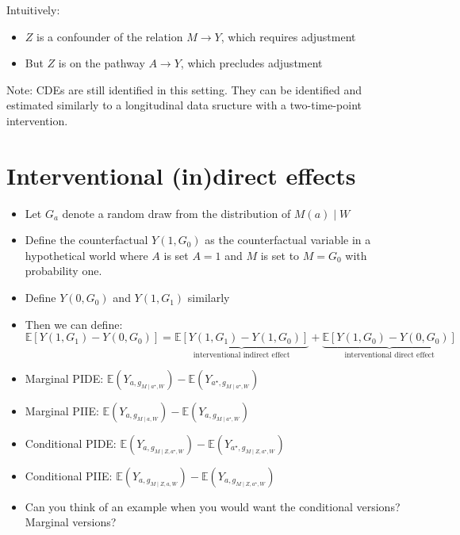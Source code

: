 \documentclass[
  12pt,
]{book}
\providecommand{\tightlist}{%
  \setlength{\itemsep}{0pt}\setlength{\parskip}{0pt}}
\theoremstyle{definition}
\theoremstyle{definition}
\theoremstyle{definition}
\newcommand{\E}{\mathbb{E}}
\newcommand{\1}{\mathbbm{1}}
\begin{document}
Intuitively:

\begin{itemize}
\tightlist
\item
  \(Z\) is a confounder of the relation \(M \rightarrow Y\), which requires adjustment
\item
  But \(Z\) is on the pathway \(A\rightarrow Y\), which precludes adjustment
\end{itemize}

Note: CDEs are still identified in this setting. They can be identified and estimated similarly to a longitudinal data sructure with a two-time-point intervention.

\hypertarget{interventional-indirect-effects}{%
\section{Interventional (in)direct effects}\label{interventional-indirect-effects}}

\begin{itemize}
\item
  Let \(G_a\) denote a random draw from the distribution of \(M(a) \mid W\)
\item
  Define the counterfactual \(Y(1,G_0)\) as the counterfactual
  variable in a hypothetical world where \(A\) is set \(A=1\) and \(M\) is
  set to \(M=G_0\) with probability one.
\item
  Define \(Y(0,G_0)\) and \(Y(1,G_1)\) similarly
\item
  Then we can define:
  \begin{equation*}
    \E[Y(1,G_1) - Y(0,G_0)] = \underbrace{\E[Y(1,G_1) -
      Y(1,G_0)]}_{\text{interventional indirect effect}} +
      \underbrace{\E[Y(1,G_0) -
      Y(0,G_0)]}_{\text{interventional direct effect}}
  \end{equation*}
\item
  Marginal PIDE: \(\E(Y_{a, g_{M \mid a^{\star}, W}}) - \E(Y_{a^{\star}, g_{M \mid a^{\star}, W}})\)
\item
  Marginal PIIE: \(\E(Y_{a, g_{M \mid a, W}}) - \E(Y_{a, g_{M \mid a^{\star}, W}})\)
\item
  Conditional PIDE: \(\E(Y_{a, g_{M \mid Z, a^{\star}, W}}) - \E(Y_{a^{\star}, g_{M \mid Z, a^{\star}, W}})\)
\item
  Conditional PIIE: \(\E(Y_{a, g_{M \mid Z, a, W}}) - \E(Y_{a, g_{M \mid Z, a^{\star}, W}})\)
\item
  Can you think of an example when you would want the conditional versions?
  Marginal versions?
\end{itemize}
\end{document}
